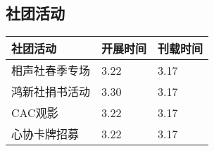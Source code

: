 \documentclass[letterpaper, 12pt]{article}
\begin{document}
\begin{multicols}{2}
\section{社团活动}
\begin{tabular}{|>{\centering\arraybackslash}m{}|m{}|m{}|}
    \hline
    社团活动 & 开展时间 & 刊载时间\\
    \hline\hline
    相声社春季专场 & 3.22 & 3.17\\
    鸿新社捐书活动 & 3.30 & 3.17\\
    CAC观影 & 3.22 & 3.17\\
    心协卡牌招募 & 3.22 & 3.17\\
    \hline
\end{tabular}

\end{multicols}
\end{document}
